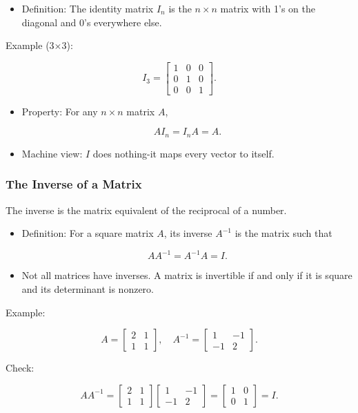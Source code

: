 \documentclass[
  letterpaper,
  DIV=11,
  numbers=noendperiod]{scrreprt}
\providecommand{\tightlist}{%
  \setlength{\itemsep}{0pt}\setlength{\parskip}{0pt}}
\begin{document}
\begin{itemize}
\tightlist
\item
  Definition: The identity matrix \(I_n\) is the \(n \times n\) matrix
  with 1's on the diagonal and 0's everywhere else.
\end{itemize}

Example (3×3):

\[
I_3 = \begin{bmatrix} 
1 & 0 & 0 \\ 
0 & 1 & 0 \\ 
0 & 0 & 1 
\end{bmatrix}.
\]

\begin{itemize}
\item
  Property: For any \(n \times n\) matrix \(A\),

  \[
  AI_n = I_nA = A.
  \]
\item
  Machine view: \(I\) does nothing-it maps every vector to itself.
\end{itemize}

\subsubsection{The Inverse of a Matrix}\label{the-inverse-of-a-matrix}

The inverse is the matrix equivalent of the reciprocal of a number.

\begin{itemize}
\item
  Definition: For a square matrix \(A\), its inverse \(A^{-1}\) is the
  matrix such that

  \[
  AA^{-1} = A^{-1}A = I.
  \]
\item
  Not all matrices have inverses. A matrix is invertible if and only if
  it is square and its determinant is nonzero.
\end{itemize}

Example:

\[
A = \begin{bmatrix} 
2 & 1 \\ 
1 & 1 
\end{bmatrix}, 
\quad 
A^{-1} = \begin{bmatrix} 
1 & -1 \\ 
-1 & 2 
\end{bmatrix}.
\]

Check:

\[
AA^{-1} = \begin{bmatrix} 
2 & 1 \\ 
1 & 1 
\end{bmatrix}
\begin{bmatrix} 
1 & -1 \\ 
-1 & 2 
\end{bmatrix}
=
\begin{bmatrix} 
1 & 0 \\ 
0 & 1 
\end{bmatrix} = I.
\]
\end{document}
